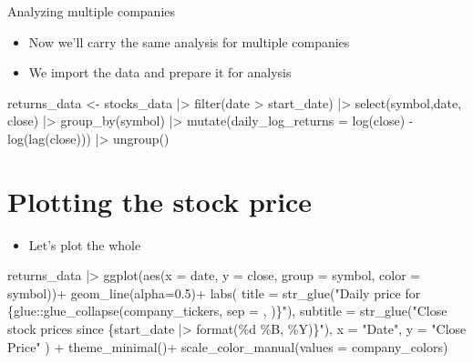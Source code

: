 \documentclass[
  12pt]{article}
\newenvironment{Shaded}{\begin{snugshade}}{\end{snugshade}}
\newcommand{\AttributeTok}[1]{\textcolor[rgb]{0.40,0.45,0.13}{#1}}
\newcommand{\FloatTok}[1]{\textcolor[rgb]{0.68,0.00,0.00}{#1}}
\newcommand{\FunctionTok}[1]{\textcolor[rgb]{0.28,0.35,0.67}{#1}}
\newcommand{\NormalTok}[1]{\textcolor[rgb]{0.00,0.23,0.31}{#1}}
\newcommand{\OtherTok}[1]{\textcolor[rgb]{0.00,0.23,0.31}{#1}}
\newcommand{\SpecialCharTok}[1]{\textcolor[rgb]{0.37,0.37,0.37}{#1}}
\newcommand{\StringTok}[1]{\textcolor[rgb]{0.13,0.47,0.30}{#1}}
\providecommand{\tightlist}{%
  \setlength{\itemsep}{0pt}\setlength{\parskip}{0pt}}\usepackage{longtable,booktabs,array}
\theoremstyle{definition}
\theoremstyle{remark}
\begin{document}
Analyzing multiple companies

\begin{itemize}
\item
  Now we'll carry the same analysis for multiple companies
\item
  We import the data and prepare it for analysis
\end{itemize}

\begin{Shaded}
\begin{Highlighting}[]
\NormalTok{returns\_data }\OtherTok{\textless{}{-}} 
\NormalTok{  stocks\_data }\SpecialCharTok{|\textgreater{}} 
  \FunctionTok{filter}\NormalTok{(date }\SpecialCharTok{\textgreater{}}\NormalTok{ start\_date) }\SpecialCharTok{|\textgreater{}} 
  \FunctionTok{select}\NormalTok{(symbol,date, close) }\SpecialCharTok{|\textgreater{}} 
  \FunctionTok{group\_by}\NormalTok{(symbol) }\SpecialCharTok{|\textgreater{}} 
  \FunctionTok{mutate}\NormalTok{(}\AttributeTok{daily\_log\_returns =} \FunctionTok{log}\NormalTok{(close) }\SpecialCharTok{{-}} \FunctionTok{log}\NormalTok{(}\FunctionTok{lag}\NormalTok{(close))) }\SpecialCharTok{|\textgreater{}} 
  \FunctionTok{ungroup}\NormalTok{()}
\end{Highlighting}
\end{Shaded}

\section{Plotting the stock price}\label{plotting-the-stock-price}

\begin{itemize}
\tightlist
\item
  Let's plot the whole
\end{itemize}

\begin{Shaded}
\begin{Highlighting}[]
\NormalTok{returns\_data }\SpecialCharTok{|\textgreater{}} 
  \FunctionTok{ggplot}\NormalTok{(}\FunctionTok{aes}\NormalTok{(}\AttributeTok{x =}\NormalTok{ date, }\AttributeTok{y =}\NormalTok{ close,  }\AttributeTok{group =}\NormalTok{ symbol, }\AttributeTok{color =}\NormalTok{ symbol))}\SpecialCharTok{+}
  \FunctionTok{geom\_line}\NormalTok{(}\AttributeTok{alpha=}\FloatTok{0.5}\NormalTok{)}\SpecialCharTok{+}
  \FunctionTok{labs}\NormalTok{(}
    \AttributeTok{title =} \FunctionTok{str\_glue}\NormalTok{(}\StringTok{"Daily price for \{glue::glue\_collapse(company\_tickers, sep = \textquotesingle{}, \textquotesingle{})\}"}\NormalTok{), }
    \AttributeTok{subtitle =} \FunctionTok{str\_glue}\NormalTok{(}\StringTok{"Close stock prices since \{start\_date |\textgreater{} format(\textquotesingle{}\%d \%B, \%Y\textquotesingle{})\}"}\NormalTok{),}
    \AttributeTok{x =} \StringTok{"Date"}\NormalTok{,}
    \AttributeTok{y =} \StringTok{"Close Price"}
\NormalTok{    ) }\SpecialCharTok{+} 
  \FunctionTok{theme\_minimal}\NormalTok{()}\SpecialCharTok{+}
  \FunctionTok{scale\_color\_manual}\NormalTok{(}\AttributeTok{values =}\NormalTok{ company\_colors)}
\end{Highlighting}
\end{Shaded}
\end{document}
